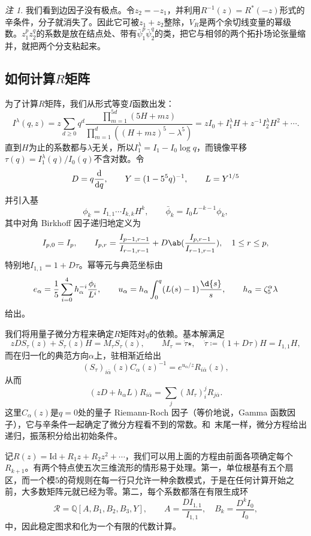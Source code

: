 \documentclass{amsart}
\theoremstyle{definition}
\theoremstyle{remark}
\newtheorem{rmk}[thm]{注}
\theoremstyle{plain}
\theoremstyle{definition}
\theoremstyle{remark}
\newcommand{\Q}{\mathbb{Q}}
\newcommand{\mc}[1]{\mathcal{#1}}
\newcommand{\mr}[1]{\mathrm{#1}}
\newcommand{\1}{\mathbf{1}}
\newcommand{\2}{\mathbf{2}}
\newcommand{\3}{\mathbf{3}}
\begin{document}
\begin{rmk}
    我们看到边因子没有极点。令\(z_2 = -z_1\)，并利用\(R^{-1}(z) = R^*(-z)\)形式的辛条件，分子就消失了。因此它可被\(z_1+z_2\)整除，\(V_R\)是两个余切线变量的幂级数。\(z_1^p z_2^q\)的系数是放在结点处、带有\(\bar{\psi}_1^p \bar{\psi}_2^q\)的类，把它与相邻的两个拓扑场论张量缩并，就把两个分支粘起来。
\end{rmk}

\subsection{如何计算\(R\)矩阵}%
\label{sub:How to compute the R-matrix (Guo)}

为了计算\(R\)矩阵，我们从形式等变\(I\)函数出发：
\[ I^{\lambda}(q,z) = z\sum_{d\geq0}q^d \frac{\prod_{m=1}^{5d}(5H+mz)}{\prod_{m=1}^d ((H+mz)^5 - \lambda^5)} = zI_0 + I_1^{\lambda}H + z^{-1}I_2^{\lambda}H^2 + \cdots. \]
直到\(H\)为止的系数都与\(\lambda\)无关，所以\(I_1^{\lambda} = I_1 - I_0 \log q\)，而镜像平移\(\tau(q) = I_1^{\lambda}(q)/I_0(q)\)不含对数。令
\[ D = q\odv{}{q}, \qquad Y = (1-5^5q)^{-1}, \qquad L = Y^{1/5} \]
并引入基
\[ \phi_k = I_{1,1}\cdots I_{k,k}H^k, \qquad \bar{\phi}_k = I_0 L^{-k-1}\phi_k, \]
其中对角 Birkhoff 因子递归地定义为
\[ I_{p,0} = I_p, \qquad I_{p,r} = \frac{I_{p-1,r-1}}{I_{r-1,r-1}} + D \ab( \frac{I_{p,r-1}}{I_{r-1,r-1}}), \quad 1 \leq r \leq p, \]
特别地\(I_{1,1} = 1+D\tau\)。幂等元与典范坐标由
\[ e_{\alpha} = \frac{1}{5}\sum_{i=0}^4 h_{\alpha}^{-i}\frac{\phi_i}{L^i}, \qquad u_{\alpha} = h_{\alpha}\int_0^q (L(s)-1)\frac{\d{s}}{s}, \qquad h_{\alpha} = \zeta_5^{\alpha}\lambda \]
给出。

我们将用量子微分方程来确定\(R\)矩阵对\(q\)的依赖。基本解满足
\[ zDS_{\tau}(z) + S_{\tau}(z)H = M_{\tau}S_{\tau}(z), \qquad M_{\tau} = \dot{\tau}\star, \quad \dot{\tau} \coloneqq (1+D\tau)H = I_{1,1}H, \]
而在归一化的典范方向\(\alpha\)上，驻相渐近给出
\[ (S_{\tau})_{i\bar{\alpha}}(z)C_{\alpha}(z)^{-1} = e^{u_{\alpha}/z}R_{i\bar{\alpha}}(z), \]
从而
\[ (zD+h_{\alpha}L)R_{i\bar{\alpha}} = \sum_j (M_{\tau})_i^j R_{j\bar{\alpha}}. \]
这里\(C_{\alpha}(z)\)是\(q=0\)处的量子 Riemann-Roch 因子（等价地说，Gamma 函数因子），它与辛条件一起确定了微分方程看不到的常数。和~末尾一样，微分方程给出递归，振荡积分给出初始条件。

记\(R(z) = \mr{Id} + R_1 z + R_2 z^2 + \cdots\)，我们可以用上面的方程由前面各项确定每个\(R_{k+1}\)。有两个特点使五次三维流形的情形易于处理。第一，单位根基有五个扇区，而一个模\(5\)的荷规则在每一行只允许一种余数模式，于是在任何计算开始之前，大多数矩阵元就已经为零。第二，每个系数都落在有限生成环
\[ \mc{R} = \Q[A,B_1,B_2,B_3,Y], \qquad A = \frac{DI_{1,1}}{I_{1,1}}, \quad B_k = \frac{D^k I_0}{I_0}, \]
中，因此稳定图求和化为一个有限的代数计算。
\end{document}
